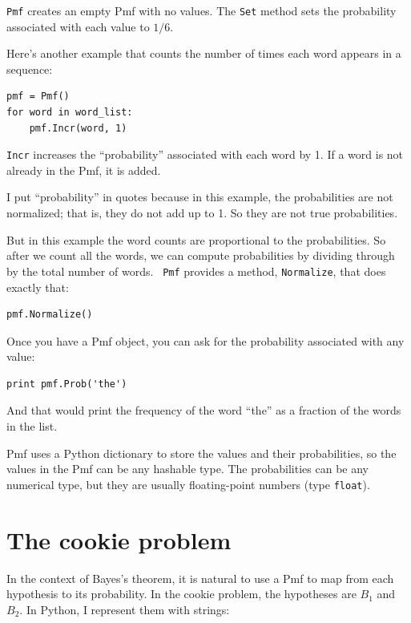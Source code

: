 \documentclass[12pt]{book}
\begin{document}
\verb"Pmf" creates an empty Pmf with no values.  The
\verb"Set" method sets the probability associated with each
value to $1/6$.

Here's another example that counts the number of times each word
appears in a sequence:

\begin{verbatim}
pmf = Pmf()
for word in word_list:
    pmf.Incr(word, 1)
\end{verbatim}

\verb"Incr" increases the ``probability'' associated with each
word by 1.  If a word is not already in the Pmf, it is added.

I put ``probability'' in quotes because in this example, the
probabilities are not normalized; that is, they do not add up to 1.
So they are not true probabilities.

But in this example the word counts are proportional to the
probabilities.  So after we count all the words, we can compute
probabilities by dividing through by the total number of words.  {\tt
  Pmf} provides a method, \verb"Normalize", that does exactly that:

\begin{verbatim}
pmf.Normalize()
\end{verbatim}

Once you have a Pmf object, you can ask for the probability
associated with any value:

\begin{verbatim}
print pmf.Prob('the')
\end{verbatim}

And that would print the frequency of the word ``the'' as a fraction
of the words in the list.

Pmf uses a Python dictionary to store the values and their
probabilities, so the values in the Pmf can be any hashable type.
The probabilities can be any numerical type, but they are usually
floating-point numbers (type \verb"float").


\section{The cookie problem}

In the context of Bayes's theorem, it is natural to use a Pmf
to map from each hypothesis to its probability.  In the cookie
problem, the hypotheses are $B_1$ and $B_2$.  In Python, I
represent them with strings:
\end{document}
